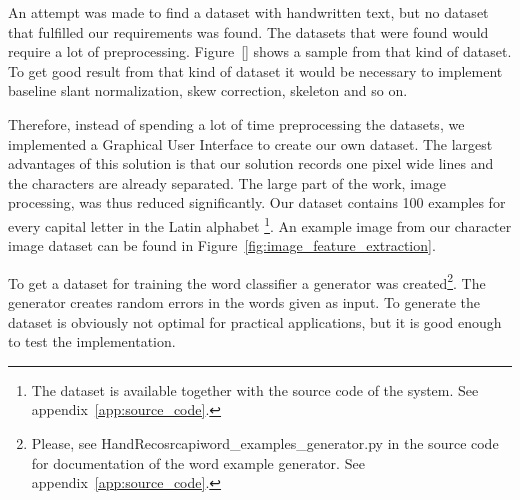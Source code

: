 
An attempt was made to find a dataset with handwritten text, but no dataset that fulfilled our requirements was found.
The datasets that were found would require a lot of preprocessing. 
Figure~\ref{} shows a sample from that kind of dataset.
To get good result from that kind of dataset it would be necessary to implement baseline slant normalization, skew correction, skeleton and so on.

Therefore, instead of spending a lot of time preprocessing the datasets, we implemented a Graphical User Interface to create our own dataset.
The largest advantages of this solution is that our solution records one pixel wide lines and the characters are already separated. 
The large part of the work, image processing, was thus reduced significantly.
Our dataset contains 100 examples for every capital letter in the Latin alphabet
\footnote{The dataset is available together with the source code of the system. See appendix~\ref{app:source_code}.}.
An example image from our character image dataset can be found in Figure~\ref{fig:image_feature_extraction}.

To get a dataset for training the word classifier a generator was created\footnote{Please, see HandReco\/src\/api\/word\_examples\_generator.py in the source code for documentation of the word example generator. See appendix~\ref{app:source_code}.}.
The generator creates random errors in the words given as input.
To generate the dataset is obviously not optimal for practical applications, but it is good enough to test the implementation.

